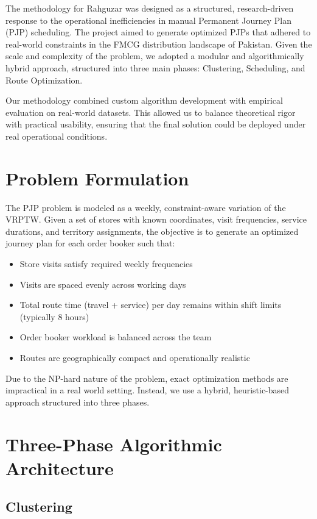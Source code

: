 
The methodology for Rahguzar was designed as a structured, research-driven response to the operational inefficiencies in manual Permanent Journey Plan (PJP) scheduling. The project aimed to generate optimized PJPs that adhered to real-world constraints in the FMCG distribution landscape of Pakistan. Given the scale and complexity of the problem, we adopted a modular and algorithmically hybrid approach, structured into three main phases: Clustering, Scheduling, and Route Optimization.

Our methodology combined custom algorithm development with empirical evaluation on real-world datasets. This allowed us to balance theoretical rigor with practical usability, ensuring that the final solution could be deployed under real operational conditions.


\section{Problem Formulation}

The PJP problem is modeled as a weekly, constraint-aware variation of the VRPTW. Given a set of stores with known coordinates, visit frequencies, service durations, and territory assignments, the objective is to generate an optimized journey plan for each order booker such that:

\begin{itemize}
  \item Store visits satisfy required weekly frequencies
  \item Visits are spaced evenly across working days
  \item Total route time (travel + service) per day remains within shift limits (typically 8 hours)
  \item Order booker workload is balanced across the team
  \item Routes are geographically compact and operationally realistic
\end{itemize}

Due to the NP-hard nature of the problem, exact optimization methods are impractical in a real world setting. Instead, we use a hybrid, heuristic-based approach structured into three phases.

\section{Three-Phase Algorithmic Architecture}

\subsection{Clustering}


